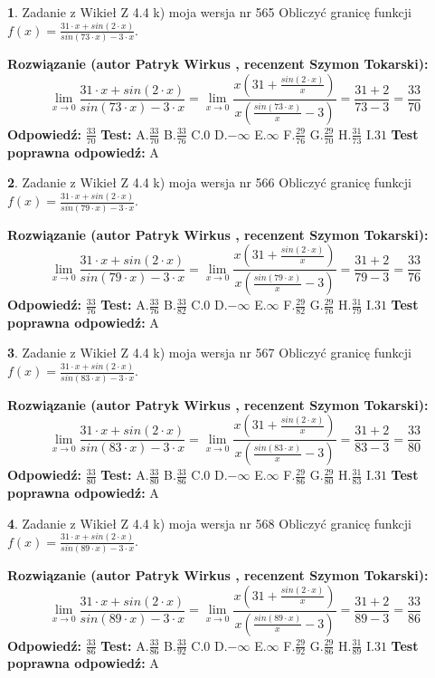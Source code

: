 \documentclass[12pt, a4paper]{article}
\theoremstyle{definition} %
\newtheorem{zad}{}
\newcommand{\zadStart}[1]{\begin{zad}#1\newline}
\newcommand{\zadStop}{\end{zad}}
\newcommand{\rozwStart}[2]{\noindent \textbf{Rozwiązanie (autor #1 , recenzent #2): }\newline}
\newcommand{\rozwStop}{\newline}
\newcommand{\odpStart}{\noindent \textbf{Odpowiedź:}\newline}
\newcommand{\odpStop}{\newline}
\newcommand{\testStart}{\noindent \textbf{Test:}\newline}
\newcommand{\testStop}{\newline}
\newcommand{\kluczStart}{\noindent \textbf{Test poprawna odpowiedź:}\newline}
\newcommand{\kluczStop}{\newline}
\begin{document}
\zadStart{Zadanie z Wikieł Z 4.4 k) moja wersja nr 565}
Obliczyć granicę funkcji $f(x)=\frac{31\cdot x +sin(2\cdot x)}{sin(73\cdot x) -3\cdot x}$.
\zadStop
\rozwStart{Patryk Wirkus}{Szymon Tokarski}
$$\lim\limits_{x\to 0}\frac{31\cdot x +sin(2\cdot x)}{sin(73\cdot x) -3\cdot x}
=\lim\limits_{x\to 0}\frac{x(31+\frac{sin(2\cdot x)}{x})}{x(\frac{sin(73\cdot x)}{x}-3)}
=\frac{31+2}{73-3} = \frac{33}{70}$$
\rozwStop
\odpStart
$\frac{33}{70}$
\odpStop
\testStart
A.$\frac{33}{70}$
B.$\frac{33}{76}$
C.$0$
D.$-\infty$
E.$\infty$
F.$\frac{29}{76}$
G.$\frac{29}{70}$
H.$\frac{31}{73}$
I.$31$
\testStop
\kluczStart
A
\kluczStop



\zadStart{Zadanie z Wikieł Z 4.4 k) moja wersja nr 566}
Obliczyć granicę funkcji $f(x)=\frac{31\cdot x +sin(2\cdot x)}{sin(79\cdot x) -3\cdot x}$.
\zadStop
\rozwStart{Patryk Wirkus}{Szymon Tokarski}
$$\lim\limits_{x\to 0}\frac{31\cdot x +sin(2\cdot x)}{sin(79\cdot x) -3\cdot x}
=\lim\limits_{x\to 0}\frac{x(31+\frac{sin(2\cdot x)}{x})}{x(\frac{sin(79\cdot x)}{x}-3)}
=\frac{31+2}{79-3} = \frac{33}{76}$$
\rozwStop
\odpStart
$\frac{33}{76}$
\odpStop
\testStart
A.$\frac{33}{76}$
B.$\frac{33}{82}$
C.$0$
D.$-\infty$
E.$\infty$
F.$\frac{29}{82}$
G.$\frac{29}{76}$
H.$\frac{31}{79}$
I.$31$
\testStop
\kluczStart
A
\kluczStop



\zadStart{Zadanie z Wikieł Z 4.4 k) moja wersja nr 567}
Obliczyć granicę funkcji $f(x)=\frac{31\cdot x +sin(2\cdot x)}{sin(83\cdot x) -3\cdot x}$.
\zadStop
\rozwStart{Patryk Wirkus}{Szymon Tokarski}
$$\lim\limits_{x\to 0}\frac{31\cdot x +sin(2\cdot x)}{sin(83\cdot x) -3\cdot x}
=\lim\limits_{x\to 0}\frac{x(31+\frac{sin(2\cdot x)}{x})}{x(\frac{sin(83\cdot x)}{x}-3)}
=\frac{31+2}{83-3} = \frac{33}{80}$$
\rozwStop
\odpStart
$\frac{33}{80}$
\odpStop
\testStart
A.$\frac{33}{80}$
B.$\frac{33}{86}$
C.$0$
D.$-\infty$
E.$\infty$
F.$\frac{29}{86}$
G.$\frac{29}{80}$
H.$\frac{31}{83}$
I.$31$
\testStop
\kluczStart
A
\kluczStop



\zadStart{Zadanie z Wikieł Z 4.4 k) moja wersja nr 568}
Obliczyć granicę funkcji $f(x)=\frac{31\cdot x +sin(2\cdot x)}{sin(89\cdot x) -3\cdot x}$.
\zadStop
\rozwStart{Patryk Wirkus}{Szymon Tokarski}
$$\lim\limits_{x\to 0}\frac{31\cdot x +sin(2\cdot x)}{sin(89\cdot x) -3\cdot x}
=\lim\limits_{x\to 0}\frac{x(31+\frac{sin(2\cdot x)}{x})}{x(\frac{sin(89\cdot x)}{x}-3)}
=\frac{31+2}{89-3} = \frac{33}{86}$$
\rozwStop
\odpStart
$\frac{33}{86}$
\odpStop
\testStart
A.$\frac{33}{86}$
B.$\frac{33}{92}$
C.$0$
D.$-\infty$
E.$\infty$
F.$\frac{29}{92}$
G.$\frac{29}{86}$
H.$\frac{31}{89}$
I.$31$
\testStop
\kluczStart
A
\kluczStop
\end{document}
